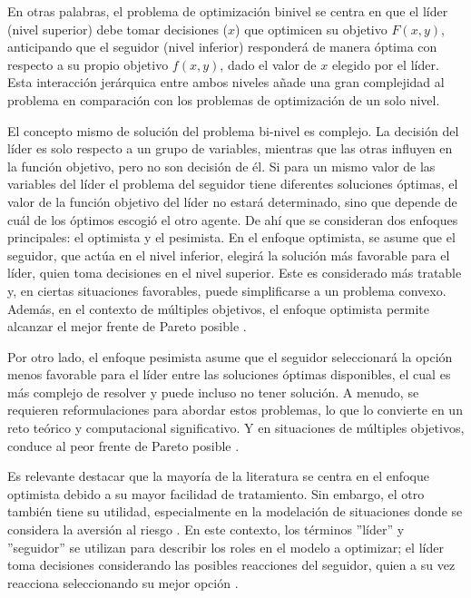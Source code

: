 En otras palabras, el problema de optimización binivel se centra en que el líder (nivel superior) debe tomar decisiones ($x$) que optimicen su objetivo $F(x, y)$, anticipando que el seguidor (nivel inferior) responderá de manera óptima con respecto a su propio objetivo $f(x, y)$, dado el valor de $x$ elegido por el líder. Esta interacción jerárquica entre ambos niveles añade una gran complejidad al problema en comparación con los problemas de optimización de un solo nivel.

El concepto mismo de solución del problema bi-nivel es complejo. La decisión del líder es solo respecto a un grupo de variables, mientras que las otras influyen en la función objetivo, pero no son decisión de él. Si para un mismo valor de las variables del líder el problema del seguidor tiene diferentes soluciones óptimas, el valor de la función objetivo del líder no estará determinado, sino que depende de cuál de los óptimos escogió el otro agente. De ahí que se consideran dos enfoques principales: el optimista y el pesimista. En el enfoque optimista, se asume que el seguidor, que actúa en el nivel inferior, elegirá la solución más favorable para el líder, quien toma decisiones en el nivel superior. Este es considerado más tratable y, en ciertas situaciones favorables, puede simplificarse a un problema convexo. Además, en el contexto de múltiples objetivos, el enfoque optimista permite alcanzar el mejor frente de Pareto posible \cite{DempeyZemkoho2020}.

Por otro lado, el enfoque pesimista asume que el seguidor seleccionará la opción menos favorable para el líder entre las soluciones óptimas disponibles, el cual es más complejo de resolver y puede incluso no tener solución. A menudo, se requieren reformulaciones para abordar estos problemas, lo que lo convierte en un reto teórico y computacional significativo. Y en situaciones de múltiples objetivos, conduce al peor frente de Pareto posible \cite{Sinha2017ARO}.

Es relevante destacar que la mayoría de la literatura se centra en el enfoque optimista debido a su mayor facilidad de tratamiento. Sin embargo, el otro también tiene su utilidad, especialmente en la modelación de situaciones donde se considera la aversión al riesgo \cite{DempeyZemkoho2020}. En este contexto, los términos ''líder'' y ''seguidor'' se utilizan para describir los roles en el modelo a optimizar; el líder toma decisiones considerando las posibles reacciones del seguidor, quien a su vez reacciona seleccionando su mejor opción \cite{Sinha2017ARO}.

